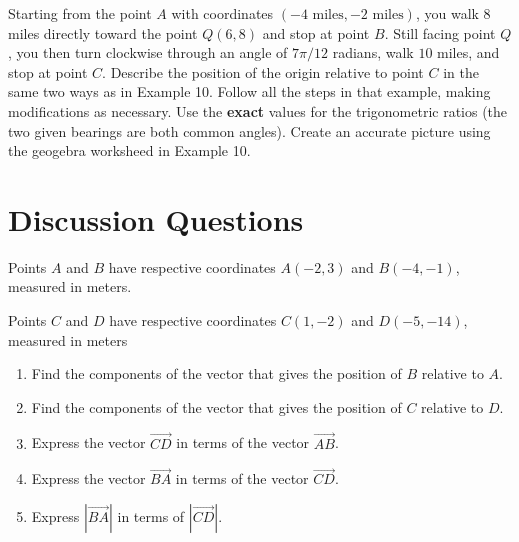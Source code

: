\documentclass{ximera}
\begin{document}
\begin{question}  \label{Qgtsygh:Vectors}
Starting from the point $A$ with coordinates $(-4 \text{ miles},-2 \text{ miles})$, you walk $8$ miles directly toward the point $Q(6,8)$ and stop at point $B$. Still facing point $Q$, you then turn clockwise through an angle of $7\pi/12$ radians, walk $10$ miles, and stop at point $C$. Describe the position of the origin relative to point $C$ in the same two ways as in Example 10. Follow all the steps in that example, making modifications as necessary. Use the {\bf exact} values for the trigonometric ratios (the two given bearings are both common angles).  Create an accurate picture using the geogebra worksheed in Example 10.


\end{question}

\section{Discussion Questions}

\begin{question}  \label{QPoDfdlLDCZXZ}
Points $A$ and $B$ have respective coordinates $A(-2,3)$ and $B(-4,-1)$, measured in meters.

Points $C$ and $D$ have respective coordinates $C(1,-2)$ and $D(-5,-14)$, measured in meters

\begin{enumerate}
\item Find the components of the vector that gives the position of $B$ relative to $A$.

\item Find the components of the vector that gives the position of $C$ relative to $D$.

\item Express the vector $\overrightarrow{CD}$ in terms of the vector $\overrightarrow{AB}$.

\item Express the vector $\overrightarrow{BA}$ in terms of the vector $\overrightarrow{CD}$.

\item Express $|\overrightarrow{BA}|$ in terms of $|\overrightarrow{CD}|$.
\end{enumerate}
\end{question}
\end{document}
